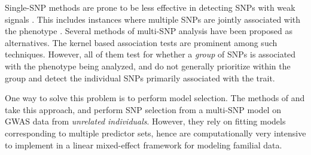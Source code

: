 Single-SNP methods are prone to be less effective in detecting SNPs with weak signals \citep{ManolioEtal09}. This includes instances where multiple SNPs are jointly associated with the phenotype \citep{YangEtal12, Ke12, SchifanoEtal12}. Several methods of multi-SNP analysis have been proposed as alternatives. The kernel based association tests \citep{SchifanoEtal12, ChenEtal13, SchaidEtal13, ILazaEtal13} are prominent among such techniques. However, all of them test for whether a {\it group} of SNPs is associated with the phenotype being analyzed, and do not generally prioritize within the group and detect the individual SNPs primarily associated with the trait.

One way to solve this problem is to perform model selection. The methods of \cite{FrommeletEtal12} and \cite{ZhangEtal14} take this approach, and perform SNP selection from a multi-SNP model on GWAS data from \textit{unrelated individuals}. However, they rely on fitting models corresponding to multiple predictor sets, hence are computationally very intensive to implement in a linear mixed-effect framework for modeling familial data.


